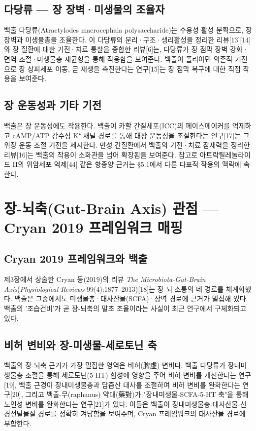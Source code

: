 \documentclass[12pt,oneside]{book}
\begin{document}
\subsection{다당류 — 장 장벽·미생물의 조율자}

백출 다당류(Atractylodes macrocephala polysaccharide)는 수용성 활성 분획으로, 장 장벽과 미생물총을 조율한다. 이 다당류의 분리·구조·생리활성을 정리한 리뷰[13][14]와 장 질환에 대한 기전·치료 통찰을 종합한 리뷰[6]는, 다당류가 장 점막 장벽 강화·면역 조절·미생물총 재균형을 통해 작용함을 보여준다. 백출이 폴리아민 의존적 기전으로 장 상피세포 이동, 곧 재생을 촉진한다는 연구[15]는 장 점막 복구에 대한 직접 작용을 보여준다.

\subsection{장 운동성과 기타 기전}

백출은 장 운동성에도 작용한다. 백출이 카할 간질세포(ICC)의 페이스메이커를 억제하고 cAMP/ATP 감수성 K⁺ 채널 경로를 통해 대장 운동성을 조절한다는 연구[17]는 그 위장 운동 조절 기전을 제시한다. 만성 간질환에서 백출의 기전·치료 잠재력을 정리한 리뷰[16]는 백출의 작용이 소화관을 넘어 확장됨을 보여준다. 참고로 아트락틸레놀라이드 II의 위암세포 억제[44] 같은 항종양 근거는 §5.1에서 다룬 다표적 작용의 맥락에 속한다.

\section{장-뇌축(Gut-Brain Axis) 관점 — Cryan 2019 프레임워크 매핑}

\subsection{Cryan 2019 프레임워크와 백출}

제3장에서 상술한 Cryan 등(2019)의 리뷰 \textit{The Microbiota-Gut-Brain Axis}(\textit{Physiological Reviews} 99(4):1877–2013)[18]는 장-뇌 소통의 네 경로를 체계화했다. 백출은 그중에서도 미생물총·대사산물(SCFA)·장벽 경로에 근거가 밀집해 있다. 백출의 '조습건비'가 곧 장-뇌축의 말초 조율이라는 사실이 최근 연구에서 구체화되고 있다.

\subsection{비허 변비와 장-미생물-세로토닌 축}

백출의 장-뇌축 근거가 가장 밀집한 영역은 비허(脾虛) 변비다. 백출 다당류가 장내미생물총 조절을 통해 세로토닌(5-HT) 합성에 영향을 주어 비허 변비를 개선한다는 연구[19], 백출 근경이 장내미생물총과 담즙산 대사를 조절하여 비허 변비를 완화한다는 연구[20], 그리고 백출-무(raphanus) 약대(藥對)가 "장내미생물-SCFA-5-HT 축"을 통해 노인성 변비를 완화한다는 연구[21]가 있다. 이들은 백출이 장내미생물총-대사산물-신경전달물질 경로를 정확히 겨냥함을 보여주며, Cryan 프레임워크의 대사산물 경로에 부합한다.
\end{document}
